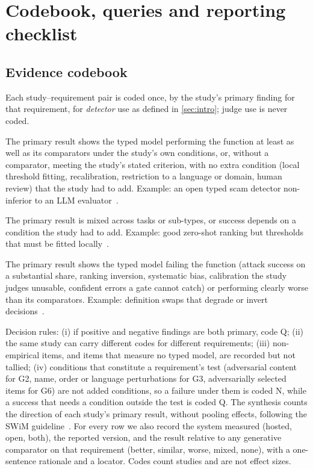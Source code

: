 \section{Codebook, queries and reporting checklist}
\label{app:codebook}

\subsection{Evidence codebook}
Each study--requirement pair is coded once, by the study's primary finding for that requirement, for \emph{detector} use as defined in \cref{sec:intro}; judge use is never coded.
\begin{description}[leftmargin=1.2em,itemsep=2pt]
  \item[S (supports)] The primary result shows the typed model performing the function at least as well as its comparators under the study's own conditions, or, without a comparator, meeting the study's stated criterion, with no extra condition (local threshold fitting, recalibration, restriction to a language or domain, human review) that the study had to add. Example: an open typed scam detector non-inferior to an LLM evaluator~\cite{arx23959}.
  \item[Q (qualifies)] The primary result is mixed across tasks or sub-types, or success depends on a condition the study had to add. Example: good zero-shot ranking but thresholds that must be fitted locally~\cite{arx29429}.
  \item[N (negative)] The primary result shows the typed model failing the function (attack success on a substantial share, ranking inversion, systematic bias, calibration the study judges unusable, confident errors a gate cannot catch) or performing clearly worse than its comparators. Example: definition swaps that degrade or invert decisions~\cite{arx26758}.
\end{description}
Decision rules: (i) if positive and negative findings are both primary, code Q; (ii) the same study can carry different codes for different requirements; (iii) non-empirical items, and items that measure no typed model, are recorded but not tallied; (iv) conditions that constitute a requirement's test (adversarial content for G2, name, order or language perturbations for G3, adversarially selected items for G6) are not added conditions, so a failure under them is coded N, while a success that needs a condition outside the test is coded Q.
The synthesis counts the direction of each study's primary result, without pooling effects, following the SWiM guideline~\cite{campbell2020swim}.
For every row we also record the system measured (hosted, open, both), the reported \jev{} version, and the result relative to any generative comparator on that requirement (better, similar, worse, mixed, none), with a one-sentence rationale and a locator.
Codes count studies and are not effect sizes.

